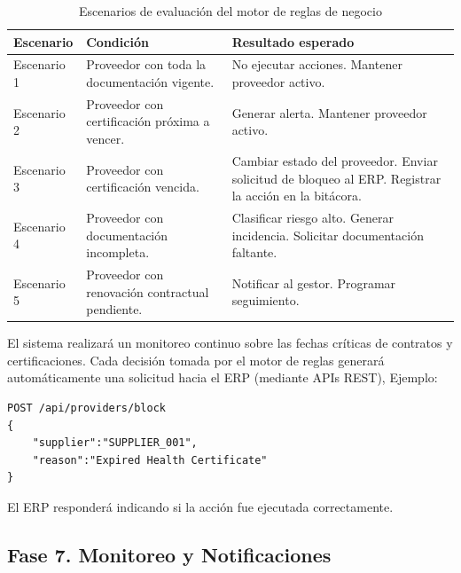\documentclass[12pt]{article}
\begin{document}
\begin{table}[htbp]
\centering
\caption{Escenarios de evaluación del motor de reglas de negocio}
\vspace{0.3cm}
\label{tab:escenarios-motor-reglas}
\renewcommand{\arraystretch}{1.2}
\begin{tabularx}{\textwidth}{|p{2.6cm}|>{\raggedright\arraybackslash}X|>{\raggedright\arraybackslash}X|}
\hline
\textbf{Escenario} & \textbf{Condición} & \textbf{Resultado esperado} \\
\hline
Escenario 1 & Proveedor con toda la documentación vigente. & No ejecutar acciones. \newline Mantener proveedor activo. \\
\hline
Escenario 2 & Proveedor con certificación próxima a vencer. & Generar alerta. \newline Mantener proveedor activo. \\
\hline
Escenario 3 & Proveedor con certificación vencida. & Cambiar estado del proveedor. \newline Enviar solicitud de bloqueo al ERP. \newline Registrar la acción en la bitácora. \\
\hline
Escenario 4 & Proveedor con documentación incompleta. & Clasificar riesgo alto. \newline Generar incidencia. \newline Solicitar documentación faltante. \\
\hline
Escenario 5 & Proveedor con renovación contractual pendiente. & Notificar al gestor. \newline Programar seguimiento. \\
\hline
\end{tabularx}
\end{table}

El sistema realizará un monitoreo continuo sobre las fechas críticas de contratos y certificaciones. Cada decisión tomada por el motor de reglas generará automáticamente una solicitud hacia el ERP (mediante APIs REST), Ejemplo:

\begin{verbatim}
POST /api/providers/block
{
    "supplier":"SUPPLIER_001",
    "reason":"Expired Health Certificate"
}
\end{verbatim}

El ERP responderá indicando si la acción fue ejecutada correctamente.

\subsection{Fase 7. Monitoreo y Notificaciones}
\end{document}
